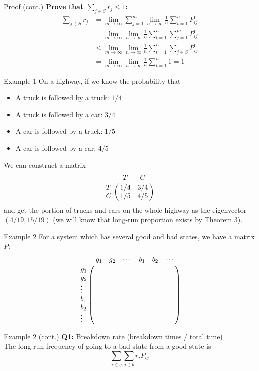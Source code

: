 \documentclass[mathserif]{beamer}
\begin{document}
\begin{frame}{Proof (cont.)}\label{proportion_sum}
	\textbf{Prove that $\sum_{j \in S} r_j \leq 1$:}\\
	\begin{align*}
	\sum_{j \in S} r_j & = 
	\lim_{m\to\infty} \sum_{j=1}^m \lim_{n\to\infty} \frac{1}{n} \sum_{t=1}^n P^t_{ij} \\
	& = \lim_{m\to\infty} \lim_{n\to\infty} \frac{1}{n}\sum_{t=1}^n \sum_{j=1}^m P^t_{ij} \\
	& \leq \lim_{m\to\infty} \lim_{n\to\infty} \frac{1}{n}\sum_{t=1}^n \sum_{j\in S} P^t_{ij} \\
	& = \lim_{m\to\infty} \lim_{n\to\infty} \frac{1}{n}\sum_{t=1}^n 1 = 1
	\end{align*}
\end{frame}

\begin{frame}{Example 1}
	On a highway, if we know the probability that
	\begin{itemize}
	\item A truck is followed by a truck: $1/4$
	\item A truck is followed by a car: $3/4$
	\item A car is followed by a truck: $1/5$
	\item A car is followed by a car: $4/5$
	\end{itemize}
	We can construct a matrix
	\[
	\bordermatrix{~ & T   & C   \cr
                  T & 1/4 & 3/4 \cr
                  C & 1/5 & 4/5 \cr}
	\]
	and get the portion of trucks and cars on the whole highway as the eigenvector $(4/19, 15/19)$
	(we will know that long-run proportion exists by Theorem 3).
\end{frame}

\begin{frame}{Example 2}
	For a system which has several good and bad states, we have a matrix $P$:
	\[
	\bordermatrix{~      & g_1 & g_2 & \cdots & b_1 & b_2 & \cdots \cr
                  g_1    &     &     &        &     &     &        \cr
                  g_2    &     &     &        &     &     &        \cr
                  \vdots &     &     &        &     &     &        \cr
                  b_1    &     &     &        &     &     &        \cr
                  b_2    &     &     &        &     &     &        \cr
                  \vdots &     &     &        &     &     &        \cr}
	\]
\end{frame}

\begin{frame}{Example 2 (cont.)}
	\textbf{Q1:} Breakdown rate (breakdown times $/$ total time)\\
	The long-run frequency of going to a bad state from a good state is
	\[
	\sum_{i \in g} \sum_{j \in b} r_i P_{ij}
	\]
\end{frame}
\end{document}

